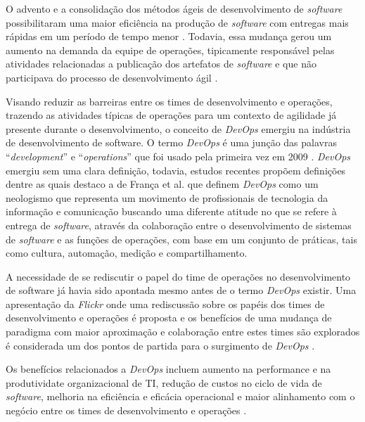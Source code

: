 O advento e a consolida\c{c}\~ao dos m\'etodos \'ageis de desenvolvimento de
\textit{software} possibilitaram uma maior efici\^encia na produ\c{c}\~ao de
\textit{software} com entregas mais r\'apidas em um per\'iodo de tempo menor
\cite{}. Todavia, essa mudan\c{c}a gerou um aumento na demanda da equipe de
opera\c{c}\~oes, tipicamente respons\'avel pelas atividades relacionadas a
publica\c{c}\~ao dos artefatos de \textit{software} e que n\~ao participava
do processo de desenvolvimento \'agil \cite{humble2010continuous}.

Visando reduzir as barreiras entre os times de desenvolvimento e opera\c{c}\~oes,
trazendo as atividades t\'ipicas de opera\c{c}\~oes para um contexto de agilidade
j\'a presente durante o desenvolvimento, o conceito de \textit{DevOps} emergiu
na ind\'ustria de desenvolvimento de software. O termo \textit{DevOps} \'e uma
jun\c{c}\~ao das palavras ``\textit{development}'' e ``\textit{operations}'' que
foi usado pela primeira vez em 2009 \cite{}. \textit{DevOps} emergiu sem uma
clara defini\c{c}\~ao, todavia, estudos recentes prop\~oem defini\c{c}\~oes
dentre as quais destaco a de Fran\c{c}a et al. \cite{characterizing_devops}
que definem \textit{DevOps} como um neologismo que representa um movimento de
profissionais de tecnologia da informa\c{c}\~ao e comunica\c{c}\~ao buscando uma
diferente atitude no que se refere \`a entrega de \textit{software},
atrav\'es da colabora\c{c}\~ao entre o desenvolvimento de sistemas de
\textit{software} e as fun\c{c}\~oes de opera\c{c}\~oes, com base em um conjunto
de pr\'aticas, tais como cultura, automa\c{c}\~ao, medi\c{c}\~ao e
compartilhamento.

A necessidade de se rediscutir o papel do time de opera\c{c}\~oes no
desenvolvimento de software j\'a havia sido apontada mesmo antes de o termo
\textit{DevOps} existir. Uma apresenta\c{c}\~ao da \textit{Flickr} \cite{flickr}
onde uma rediscuss\~ao sobre os pap\'eis dos times de desenvolvimento e
opera\c{c}\~oes \'e proposta e os benef\'icios de uma mudan\c{c}a de paradigma
com maior aproxima\c{c}\~ao e colabora\c{c}\~ao entre estes times s\~ao
explorados \'e considerada um dos pontos de partida para o surgimento de
\textit{DevOps} \cite{devops_for_developers}.

Os benef\'icios relacionados a \textit{DevOps} incluem aumento na performance
e na produtividate organizacional de TI, redu\c{c}\~ao de custos no ciclo de vida
de \textit{software}, melhoria na efici\^encia e efic\'acia operacional e maior
alinhamento com o negócio entre os times de desenvolvimento e opera\c{c}\~oes
\cite{characterizing_devops}.

